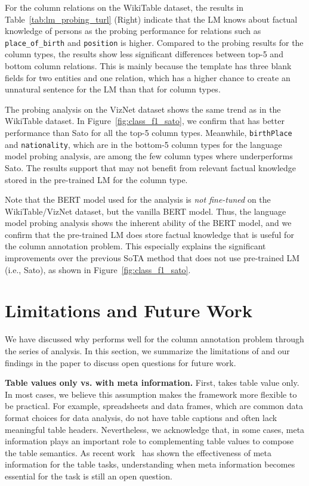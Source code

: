 For the column relations on the WikiTable dataset, the results in Table~\ref{tab:lm_probing_turl} (Right) indicate that the LM knows about factual knowledge of persons as the probing performance for relations such as {\tt place\_of\_birth} and {\tt position} is higher.
%
Compared to the probing results for the column types, the results show less significant differences between top-5 and bottom column relations. This is mainly because the template has three blank fields for two entities and one relation, which has a higher chance to create an unnatural sentence for the LM than that for column types.


The probing analysis on the VizNet dataset shows the same trend as in the WikiTable dataset. In Figure~\ref{fig:class_f1_sato}, we confirm that \name{} has better performance than Sato for all the top-5 column types. Meanwhile, {\tt birthPlace} and {\tt nationality}, which are in the bottom-5 column types for the language model probing analysis, are among the few column types where \name{} underperforms Sato. The results support that \name{} may not benefit from relevant factual knowledge stored in the pre-trained LM for the column type.


Note that the BERT model used for the analysis is {\em not fine-tuned} on the WikiTable/VizNet dataset, but the vanilla BERT model. Thus, the language model probing analysis shows the inherent ability of the BERT model, and we confirm that the pre-trained LM does store factual knowledge that is useful for the column annotation problem. 
%
This especially explains the significant improvements over the previous SoTA method that does not use pre-trained LM (i.e., Sato), as shown in Figure~\ref{fig:class_f1_sato}.


\section{Limitations and Future Work}\label{sec:discussion}
We have discussed why \name{} performs well for the column annotation problem through the series of analysis. In this section, we summarize the limitations of \name{} and our findings in the paper to discuss open questions for future work.

\noindent
{\bf Table values only vs. with meta information.}
First, \name{} takes table value only. In most cases, we believe this assumption makes the framework more flexible to be practical.
%
For example, spreadsheets and data frames, which are common data format choices for data analysis, do not have table captions and often lack meaningful table headers.
%
Nevertheless, we acknowledge that, in some cases, meta information plays an important role to complementing table values to compose the table semantics.
%
As recent work~\cite{Deng:2020:TURL,Wang:2021:TCN} has shown the effectiveness of meta information for the table tasks, understanding when meta information becomes essential for the task is still an open question.


